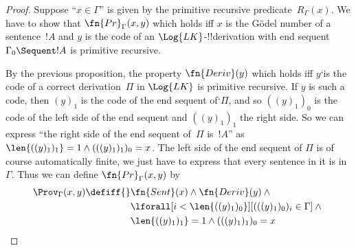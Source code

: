 \documentclass[../../include/open-logic-section]{subfiles}
\begin{document}
\begin{proof}
Suppose ``$x \in \Gamma$'' is given by the primitive recursive
predicate~$R_\Gamma(x)$. We have to show that $\fn{Pr}_\Gamma(x, y)$
which holds iff $x$ is the G\"odel number of a sentence~$!A$ and $y$
is the code of an $\Log{LK}$-!!{derivation} with end sequent
$\Gamma_0 \Sequent !A$ is primitive recursive.

By the previous proposition, the property $\fn{Deriv}(y)$ which holds
iff $y$`is the code of a correct derivation~$\Pi$ in $\Log{LK}$ is
primitive recursive.  If $y$ is such a code, then $(y)_1$ is the code
of the end sequent of`$\Pi$, and so $((y)_1)_0$ is the code of the
left side of the end sequent and $((y)_1)_1$ the right side. So we can
express ``the right side of the end sequent of~$\Pi$ is~$!A$'' as
$\len{((y)_1)_1} = 1 \land (((y)_1)_1)_0 = x$.  The left side of the
end sequent of $\Pi$ is of course automatically finite, we just have
to express that every sentence in it is in~$\Gamma$.  Thus we can
define $\fn{Pr}_\Gamma(x, y)$ by
\begin{align*}
\Prov_\Gamma(x, y) \defiff {}&
\fn{Sent}(x) \land \fn{Deriv}(y) \land {} \\
& \lforall[i <
  \len{((y)_1)_0}][(((y)_1)_0)_i \in \Gamma] \land {}\\
& \len{((y)_1)_1} = 1 \land (((y)_1)_1)_0 = x
\end{align*}
\end{proof}
\end{document}
